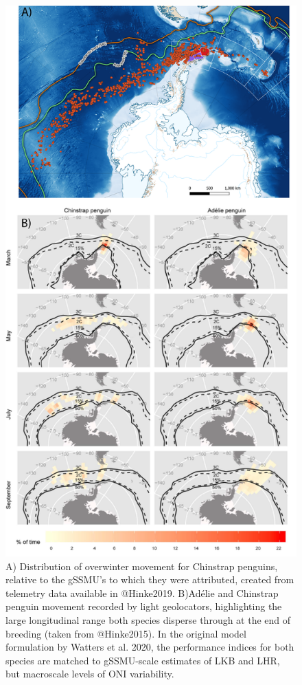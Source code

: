 \documentclass[]{elsarticle} %
\begin{document}
\begin{figure}
\includegraphics[width=0.75\linewidth]{./Watters EMM figures/Overwinter pengo distributions} \caption{A) Distribution of overwinter movement for Chinstrap penguins, relative to the gSSMU's to which they were attributed, created from telemetry data available in @Hinke2019.  B)Adélie and Chinstrap penguin movement recorded by light geolocators, highlighting the large longitudinal range both species disperse through at the end of breeding (taken from @Hinke2015).  In the original model formulation by Watters et al. 2020, the performance indices for both species are matched to gSSMU-scale estimates of LKB and LHR, but macroscale levels of ONI variability.}\label{fig:Overwinter penguin distribution plots}
\end{figure}
\end{document}
